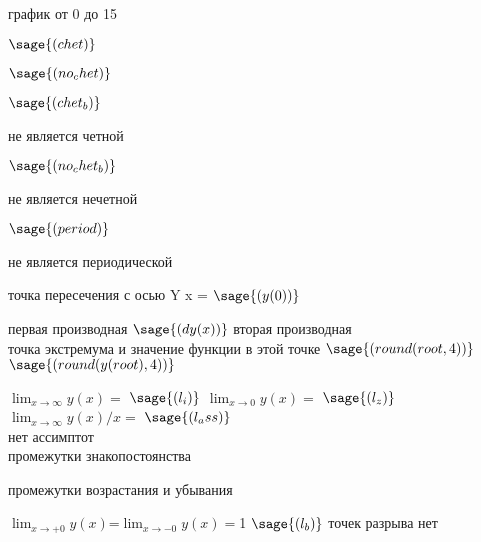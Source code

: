 график от 0 до 15

\begin{center}
\end{center}
\large $\sage{(chet)}$

\large $\sage{(no_chet)}$

\large $\sage{(chet_b)}$

не является четной

\large $\sage{(no_chet_b)}$


не является нечетной

\large $\sage{(period)}$

не является периодической

точка пересечения с осью Y
x =
\large $\sage{(y(0))}$
\begin{center}
\end{center}
первая производная
\large $\sage{(dy(x))}$
вторая производная\\
точка экстремума и значение функции в этой точке
\large $\sage{(round(root,4))}$ $\sage{(round(y(root),4))}$
\begin{center}
\end{center}
\begin{center}
\end{center}
$\lim_{x\to\infty} y(x)=$ $\sage{(l_i)}$
$\lim_{x\to 0} y(x)=$ $\sage{(l_z)}$
$\lim_{x\to\infty} y(x)/x=$ $\sage{(l_ass)}$\\
нет ассимптот\\
промежутки знакопостоянства
\begin{center}
\end{center}
промежутки возрастания и убывания
\begin{center}
\end{center}
$\lim_{x\to +0} y(x)$=$\lim_{x\to-0} y(x)=$1
\large $\sage{(l_b)}$
точек разрыва нет
